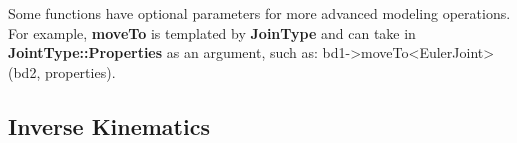 Some functions have optional parameters for more advanced modeling
operations. For example, \textbf{moveTo} is templated by \textbf{JoinType} and
can take in \textbf{JointType::Properties} as an argument, such as:
bd1->moveTo<EulerJoint>(bd2, properties).

\subsection{Inverse Kinematics}
\label{sec:ik}
